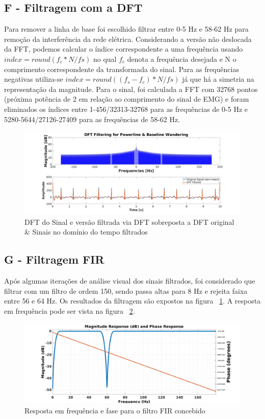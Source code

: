 \documentclass{article}
\begin{document}
\subsection*{F - Filtragem com a DFT}
Para remover a linha de base foi escolhido filtrar entre 0-5 Hz e 58-62 Hz para remoção da interferência da rede elétrica. Considerando a versão não deslocada da FFT, podemos calcular o índice correspondente a uma frequência usando $index = round(f_c * N /fs )$ no qual $f_c$ denota a frequência desejada e N o comprimento correspondente da transformada do sinal. Para as frequências negativas utiliza-se $index = round((f_s - f_c) * N /fs )$ já que há a simetria na representação da magnitude. Para o sinal, foi calculada a FFT com 32768 pontos (próxima potência de 2 em relação ao comprimento do sinal de EMG) e foram eliminados os índices entre 1-456/32313-32768 para as frequências de 0-5 Hz e 5280-5644/27126-27409 para as frequências de 58-62 Hz.
\begin{figure}[H]
	\begin{center}
		\includegraphics[scale=0.25]{../Q2_DFT-Filter-Time.png}
		\caption{DFT do Sinal e versão filtrada via DFT sobreposta a DFT original \& Sinais no domínio do tempo filtrados}
		\label{fig:Q2_DFT}
	\end{center}
\end{figure}

\subsection*{G - Filtragem FIR}
Após algumas iterações de análise visual dos sinais filtrados, foi considerado que filtrar com um filtro de ordem 150, sendo passa altas para 8 Hz e rejeita faixa entre 56 e 64 Hz. Os resultados da filtragem são expostos na figura ~\ref{fig:Q2_DFT}. A resposta em frequência pode ser vista na figura ~\ref{fig:Q2_FV}.

\begin{figure}[H]
	\begin{center}
		\includegraphics[scale=0.25]{../Q2_fvtool.png}
		\caption{Resposta em frequência e fase para o filtro FIR concebido}
		\label{fig:Q2_FV}
	\end{center}
\end{figure}
\end{document}
